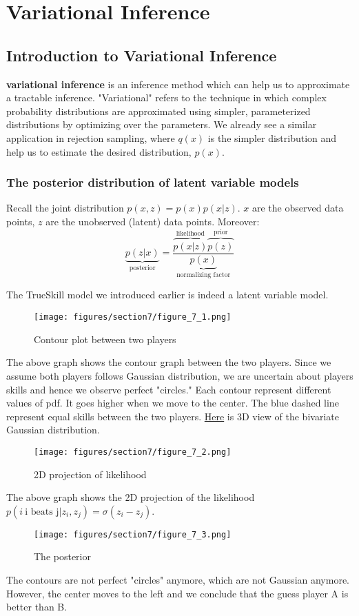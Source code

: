 \section{Variational Inference}
\subsection{Introduction to Variational Inference}
\textbf{variational inference} is an inference method which can help us to approximate a tractable inference. "Variational" refers to the technique in which complex probability distributions are approximated using simpler, parameterized distributions by optimizing over the parameters. We already see a similar application in rejection sampling, where $q(x)$ is the simpler distribution and help us to estimate the desired distribution, $p(x)$.
\subsubsection*{The posterior distribution of latent variable models}
Recall the joint distribution $p(x,z)=p(x)p(x|z)$. $x$ are the observed data points, $z$ are the unobserved (latent) data points. Moreover:
$$\underbrace{p(z|x)}_{\text{posterior}}=\frac{\overbrace{p(x|z)}^{\text{likelihood}}\overbrace{p(z)}^{\text{prior}}}{\underbrace{p(x)}_{\text{normalizing factor}}}$$
\begin{example}
    The TrueSkill model we introduced earlier is indeed a latent variable model.
    \begin{figure}[H]
        \centering
        \texttt{[image: figures/section7/figure\_7\_1.png]}
        \caption{Contour plot between two players}
        \label{fig:prior_trueskill}
    \end{figure}
    The above graph shows the contour graph between the two players. Since we assume both players follows Gaussian distribution, we are uncertain about players skills and hence we observe perfect "circles." Each contour represent different values of pdf. It goes higher when we move to the center. The blue dashed line represent equal skills between the two players. \href{https://en.wikipedia.org/wiki/Multivariate_normal_distribution#/media/File:Multivariate_Gaussian.png}{Here} is 3D view of the bivariate Gaussian distribution.
    \begin{figure}[H]
        \centering
        \texttt{[image: figures/section7/figure\_7\_2.png]}
        \caption{2D projection of likelihood}
        \label{fig:likelihood_trueskill}
    \end{figure}
    The above graph shows the 2D projection of the likelihood $p(i\:\text{i beats j}|z_i,z_j)=\sigma(z_i-z_j)$.
    \begin{figure}[H]
        \centering
        \texttt{[image: figures/section7/figure\_7\_3.png]}
        \caption{The posterior}
        \label{fig:posterior_trueskill}
    \end{figure}
    The contours are not perfect "circles" anymore, which are not Gaussian anymore. However, the center moves to the left and we conclude that the guess player A is better than B.
\end{example}
